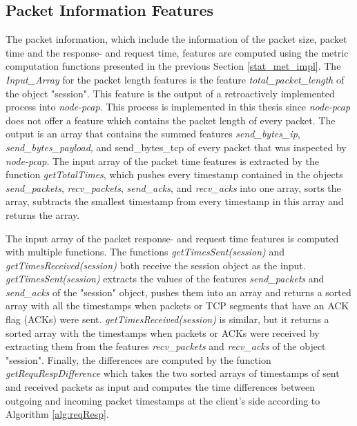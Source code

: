 \subsection{Packet Information Features}
The packet information, which include the information of the packet size, packet time and the response- and request time, features are computed using the metric computation functions presented in the previous Section \ref{stat_met_impl}. The \textit{Input\_Array} for the packet length features is the feature \textit{total\_packet\_length} of the object "session". This feature is the output of a retroactively implemented process into \textit{node-pcap}. This process is implemented in this thesis since \textit{node-pcap} does not offer a feature which contains the packet length of every packet. The output is an array that contains the summed features \textit{send\_bytes\_ip}, \textit{send\_bytes\_payload}, and {send\_bytes\_tcp} of every packet that was inspected by \textit{node-pcap}. The input array of the packet time features is extracted by the function \textit{getTotalTimes}, which pushes every timestamp contained in the objects \textit{send\_packets}, \textit{recv\_packets}, \textit{send\_acks}, and \textit{recv\_acks} into one array, sorts the array, subtracts the smallest timestamp from every timestamp in this array and returns the array.  

The input array of the packet response- and request time features is computed with multiple functions. The functions \textit{getTimesSent(session)} and \textit{getTimesReceived(session)} both receive the session object as the input. \textit{getTimesSent(session)} extracts the values of the features \textit{send\_packets} and \textit{send\_acks} of the "session" object, pushes them into an array and returns a sorted array with all the timestamps when packets or TCP segments that have an ACK flag (ACKs) were sent. \textit{getTimesReceived(session)} is similar, but it returns a sorted array with the timestamps when packets or ACKs were received by extracting them from the features \textit{recv\_packets} and \textit{recv\_acks} of the object "session". Finally, the differences are computed by the function \textit{getRequRespDifference} which takes the two sorted arrays of timestamps of sent and received packets as input and computes the time differences between outgoing and incoming packet timestamps at the client's side according to Algorithm \ref{alg:reqResp}.

